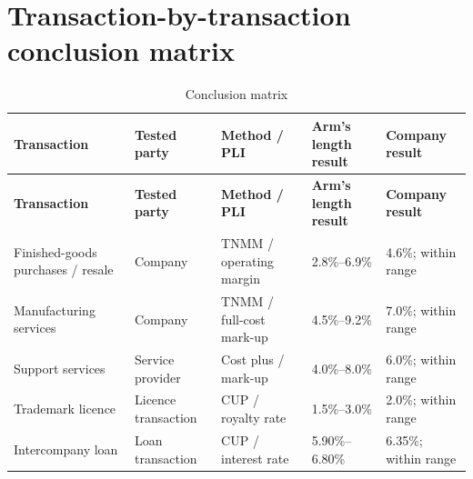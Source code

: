 \chapter{Transaction-by-transaction conclusion matrix}
\begin{longtable}{@{}P{27mm}P{24mm}P{24mm}P{25mm}P{29mm}@{}}
  \caption{Conclusion matrix}\label{tab:matrix}\\
  \toprule
  \textbf{Transaction} & \textbf{Tested party} & \textbf{Method / PLI} &
    \textbf{Arm's length result} & \textbf{Company result}\\
  \midrule
  \endfirsthead
  \toprule
  \textbf{Transaction} & \textbf{Tested party} & \textbf{Method / PLI} &
    \textbf{Arm's length result} & \textbf{Company result}\\
  \midrule
  \endhead
  Finished-goods purchases / resale & Company & TNMM / operating margin & 2.8\%--6.9\% & 4.6\%; within range\\
  Manufacturing services & Company & TNMM / full-cost mark-up & 4.5\%--9.2\% & 7.0\%; within range\\
  Support services & Service provider & Cost plus / mark-up & 4.0\%--8.0\% & 6.0\%; within range\\
  Trademark licence & Licence transaction & CUP / royalty rate & 1.5\%--3.0\% & 2.0\%; within range\\
  Intercompany loan & Loan transaction & CUP / interest rate & 5.90\%--6.80\% & 6.35\%; within range\\
  \bottomrule
\end{longtable}
